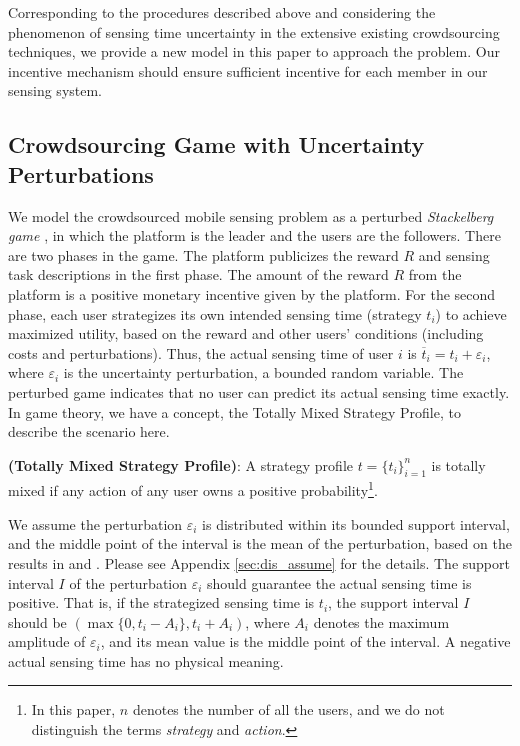 \documentclass{IEEEtran}
\begin{document}
Corresponding to the procedures described above and considering the phenomenon of sensing {\color{black}time} uncertainty in the extensive existing crowdsourcing techniques, we provide a new model in this paper to approach the problem. Our incentive mechanism should ensure sufficient incentive for each member in our sensing system. 

\subsection{Crowdsourcing Game with Uncertainty Perturbations}
\label{sec:model}
We model the crowdsourced mobile sensing problem as a perturbed \emph{Stackelberg game} \cite{basar:game}, in which the platform is the leader and the users are the followers. There are two phases in the game. The platform publicizes the reward $R$ and sensing task descriptions in the first phase. The amount of the reward $R$ from the platform is a positive monetary incentive given by the platform. For the second phase, each user strategizes its own intended sensing time (strategy $t_i$) to achieve maximized utility, based on the reward and other users' conditions (including costs and perturbations). Thus, the actual sensing time of user $i$ is $\overline{t}_i=t_i+\varepsilon_i$, where $\varepsilon_i$ is the uncertainty perturbation, a bounded random variable. The perturbed game indicates that no user can predict its actual sensing time exactly. In game theory, we have a concept, the Totally Mixed Strategy Profile, to describe the scenario here. %

\begin{definition}
{\bf (Totally Mixed Strategy Profile)}: A strategy profile $t=\{t_i\}_{i=1}^n$ is totally mixed if any action of any user owns a positive probability\footnote{In this paper, $n$ denotes the number of all the users, and we do not distinguish the terms \emph{strategy} and \emph{action}.}.
\end{definition}

We assume the perturbation $\varepsilon_i$ is distributed within its bounded support interval, and the middle point of the interval is the mean of the perturbation, based on the results in \cite{wmb, burkardt2014truncated} and \cite{damien2001sampling}. Please see Appendix \ref{sec:dis_assume} for the details. The support interval $I$ of the perturbation $\varepsilon_i$ should guarantee the actual sensing time is positive. That is, if the strategized sensing time is $t_i$, the support interval $I$ should be $(\max{\{0,t_i-A_i\}},t_i+A_i)$, where $A_i$ denotes the maximum amplitude of $\varepsilon_i$, and its mean value is the middle point of the interval. A negative actual sensing time has no physical meaning.
\end{document}
